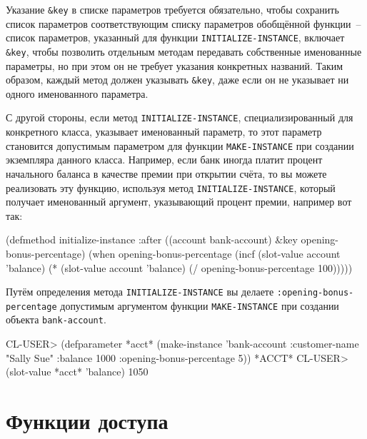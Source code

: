 Указание \lstinline!&key! в списке параметров требуется обязательно, чтобы сохранить
список параметров соответствующим списку параметров обобщённой функции~-- список
параметров, указанный для функции \lstinline{INITIALIZE-INSTANCE}, включает \lstinline!&key!,
чтобы позволить отдельным методам передавать собственные именованные параметры, но при
этом он не требует указания конкретных названий.  Таким образом, каждый метод должен
указывать \lstinline!&key!, даже если он не указывает ни одного именованного параметра.

С другой стороны, если метод \lstinline{INITIALIZE-INSTANCE}, специализированный для
конкретного класса, указывает именованный параметр, то этот параметр становится допустимым
параметром для функции \lstinline{MAKE-INSTANCE} при создании экземпляра данного класса.
Например, если банк иногда платит процент начального баланса в качестве премии при
открытии счёта, то вы можете реализовать эту функцию, используя метод
\lstinline{INITIALIZE-INSTANCE}, который получает именованный аргумент, указывающий процент
премии, например вот так:

\begin{myverb}
(defmethod initialize-instance :after ((account bank-account)
                                       &key opening-bonus-percentage)
  (when opening-bonus-percentage
    (incf (slot-value account 'balance)
          (* (slot-value account 'balance) (/ opening-bonus-percentage 100)))))
\end{myverb}

Путём определения метода \lstinline{INITIALIZE-INSTANCE} вы делаете
\lstinline{:opening-bonus-percentage} допустимым аргументом функции \lstinline{MAKE-INSTANCE} при
создании объекта \lstinline{bank-account}.

\begin{myverb}
  CL-USER> (defparameter *acct* (make-instance
                                  'bank-account
                                   :customer-name "Sally Sue"
                                   :balance 1000
                                   :opening-bonus-percentage 5))
  *ACCT*
  CL-USER> (slot-value *acct* 'balance)
  1050
\end{myverb}

\section{Функции доступа}

